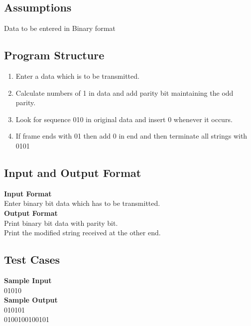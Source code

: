 \documentclass[12pt]{article}
\begin{document}
\subsection{Assumptions}
{
Data to be entered in Binary format
}

\subsection{Program Structure}
{
\begin{enumerate}
\item Enter a data which is to be transmitted.
\item Calculate numbers of 1 in data and add parity bit maintaining the odd parity.
\item Look for sequence 010 in original data and insert 0 whenever it occurs.
\item If frame ends with 01 then add 0 in end and then terminate all strings with 0101 
\end{enumerate} 
}




\subsection{Input and Output Format}
{
\textbf{Input Format}\\
Enter binary bit data which has to be transmitted.\\
\textbf{Output Format}\\
Print binary bit data with parity bit.\\
Print the modified string received at the other end.

}
\subsection{Test Cases}

\textbf{Sample Input}\\
01010\\
\textbf{Sample Output}\\
010101\\
0100100100101
\end{document}
